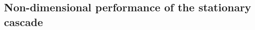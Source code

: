 
\subsection{Non-dimensional performance of the stationary cascade}
\label{sec:cascadeNonDimensional}

